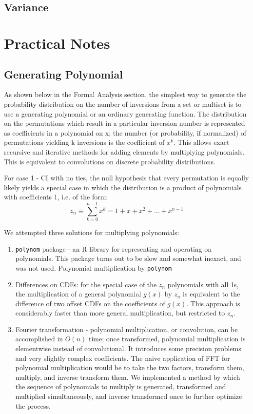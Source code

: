 \documentclass{article}
\begin{document}
\subsection{Variance}

\section{Practical Notes}

\subsection{Generating Polynomial}
As shown below in the Formal Analysis section, the simplest way to generate the probability distribution on the number of inversions from a set or multiset is to use a generating polynomial or an ordinary generating function.  The distribution on the permutations which result in a particular inversion number is represented as coefficients in a polynomial on x; the number (or probability, if normalized) of permutations yielding k inversions is the coefficient of $x^{k}$.  This allows exact recursive and iterative methods for adding elements by multiplying polynomials.  This is equivalent to convolutions on discrete probability distributions.

For case 1 - CI with no ties, the null hypothesis that every permutation is equally likely yields a special case in which the distribution is a product of polynomials with coefficients 1, i.e. of the form:
\begin{equation}
z_{n} \equiv \sum_{k=0}^{n-1} x^{k} = 1 + x + x^{2} + ... + x^{n-1}
\end{equation}

We attempted three solutions for multiplying polynomials:
\begin{enumerate}
\item \texttt{polynom} package - an R library for representing and operating on polynomials.  This package turns out to be slow and somewhat inexact, and was not used.  Polynomial multiplication by \texttt{polynom}
\item Differences on CDFs: for the special case of the $z_{n}$ polynomials with all 1s, the multiplication of a general polynomial $g(x)$ by $z_{n}$ is equivalent to the difference of two offset CDFs on the coefficients of $g(x)$.  This approach is considerably faster than more general multiplication, but restricted to $z_{n}$.
\item Fourier transformation - polynomial multiplication, or convolution, can be accomplished in $O(n)$ time; once transformed, polynomial multiplication is elementwise instead of convolutional.  It introduces some precision problems and very slightly complex coefficients.  The naive application of FFT for polynomial multiplication would be to take the two factors, transform them, multiply, and inverse transform them.  We implemented a method by which the sequence of polynomials to multiply is generated, transformed and multiplied simultaneously, and inverse transformed once to further optimize the process. 
\end{enumerate}
\end{document}
